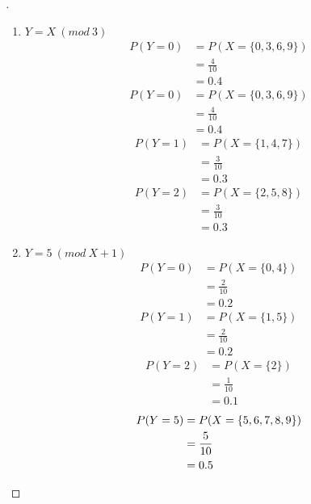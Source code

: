 \documentclass[paper=usletter, fontsize=12pt]{article}
\begin{document}
\begin{enumerate}
\begin{proof}[\unskip\nopunct]
\begin{enumerate}
                \item $Y = X \ (mod \ 3)$\\
                \begin{align*}
                    P(Y = 0) & = P(X = \{0,3,6,9\})\\
                    & = \frac{4}{10}\\
                    & = 0.4
                \end{align*}
                \begin{align*}
                    P(Y = 0) & = P(X = \{0,3,6,9\})\\
                    & = \frac{4}{10}\\
                    & = 0.4
                \end{align*}
                \begin{align*}
                    P(Y = 1) & = P(X = \{1,4,7\})\\
                    & = \frac{3}{10}\\
                    & = 0.3
                \end{align*}
                \begin{align*}
                    P(Y = 2) & = P(X = \{2,5,8\})\\
                    & = \frac{3}{10}\\
                    & = 0.3
                \end{align*}

                \item $Y = 5 \ (mod \ X + 1)$\\
                \begin{align*}
                    P(Y = 0) & = P(X = \{0,4\})\\
                    & = \frac{2}{10}\\
                    & = 0.2
                \end{align*}
                \begin{align*}
                    P(Y = 1) & = P(X = \{1,5\})\\
                    & = \frac{2}{10}\\
                    & = 0.2
                \end{align*}
                \begin{align*}
                    P(Y = 2) & = P(X = \{2\})\\
                    & = \frac{1}{10}\\
                    & = 0.1
                \end{align*}
                \begin{align*}
                    P(Y = 5) & = P(X = \{5,6,7,8,9\})\\
                    & = \frac{5}{10}\\
                    & = 0.5 \qedhere
                \end{align*}


\end{enumerate}
\end{proof}
\end{enumerate}
\end{document}
